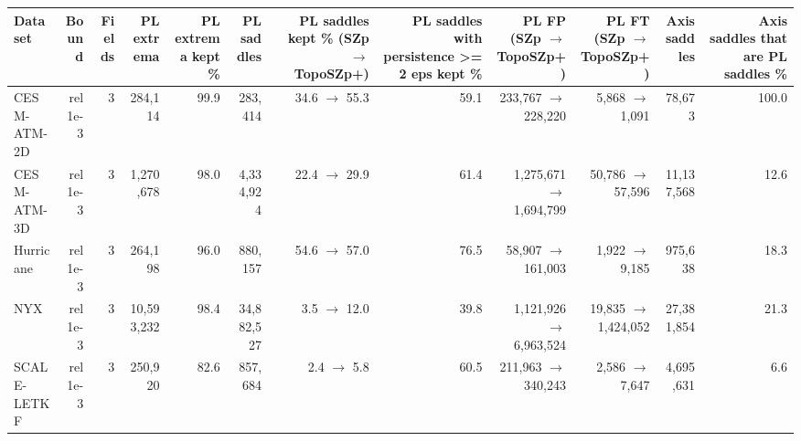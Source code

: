 \begin{tabular}{lrrrrrrrrrrr}
\toprule
\textbf{Dataset} & \textbf{Bound} & \textbf{Fields} & \textbf{PL extrema} & \textbf{PL extrema kept \%} & \textbf{PL saddles} & \textbf{PL saddles kept \% (SZp $\to$ TopoSZp+)} & \textbf{PL saddles with persistence >= 2 eps kept \%} & \textbf{PL FP (SZp $\to$ TopoSZp+)} & \textbf{PL FT (SZp $\to$ TopoSZp+)} & \textbf{Axis saddles} & \textbf{Axis saddles that are PL saddles \%} \\
\midrule
CESM-ATM-2D & rel 1e-3 & 3 & 284,114 & 99.9 & 283,414 & 34.6 $\to$ 55.3 & 59.1 & 233,767 $\to$ 228,220 & 5,868 $\to$ 1,091 & 78,673 & 100.0 \\
CESM-ATM-3D & rel 1e-3 & 3 & 1,270,678 & 98.0 & 4,334,924 & 22.4 $\to$ 29.9 & 61.4 & 1,275,671 $\to$ 1,694,799 & 50,786 $\to$ 57,596 & 11,137,568 & 12.6 \\
Hurricane & rel 1e-3 & 3 & 264,198 & 96.0 & 880,157 & 54.6 $\to$ 57.0 & 76.5 & 58,907 $\to$ 161,003 & 1,922 $\to$ 9,185 & 975,638 & 18.3 \\
NYX & rel 1e-3 & 3 & 10,593,232 & 98.4 & 34,882,527 & 3.5 $\to$ 12.0 & 39.8 & 1,121,926 $\to$ 6,963,524 & 19,835 $\to$ 1,424,052 & 27,381,854 & 21.3 \\
SCALE-LETKF & rel 1e-3 & 3 & 250,920 & 82.6 & 857,684 & 2.4 $\to$ 5.8 & 60.5 & 211,963 $\to$ 340,243 & 2,586 $\to$ 7,647 & 4,695,631 & 6.6 \\
\bottomrule
\end{tabular}

